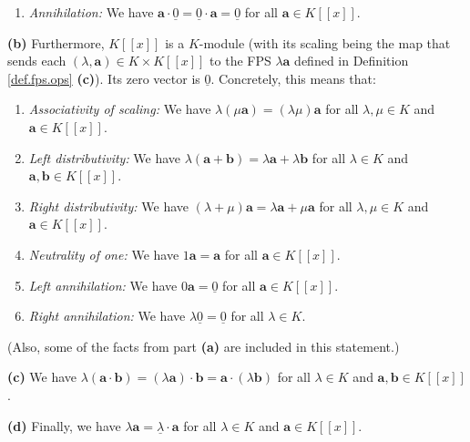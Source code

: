 \begin{theorem}
\begin{enumerate}
\item \emph{Annihilation:} We have $\mathbf{a}\cdot\underline{0}%
=\underline{0}\cdot\mathbf{a}=\underline{0}$ for all $\mathbf{a}\in K\left[
\left[  x\right]  \right]  $.
\end{enumerate}

\textbf{(b)} Furthermore, $K\left[  \left[  x\right]  \right]  $ is a
$K$-module (with its scaling being the map that sends each $\left(
\lambda,\mathbf{a}\right)  \in K\times K\left[  \left[  x\right]  \right]  $
to the FPS $\lambda\mathbf{a}$ defined in Definition \ref{def.fps.ops}
\textbf{(c)}). Its zero vector is $\underline{0}$. Concretely, this means that:

\begin{enumerate}
\item[10.] \emph{Associativity of scaling:} We have $\lambda\left(
\mu\mathbf{a}\right)  =\left(  \lambda\mu\right)  \mathbf{a}$ for all
$\lambda,\mu\in K$ and $\mathbf{a}\in K\left[  \left[  x\right]  \right]  $.

\item[11.] \emph{Left distributivity:} We have $\lambda\left(  \mathbf{a}%
+\mathbf{b}\right)  =\lambda\mathbf{a}+\lambda\mathbf{b}$ for all $\lambda\in
K$ and $\mathbf{a},\mathbf{b}\in K\left[  \left[  x\right]  \right]  $.

\item[12.] \emph{Right distributivity:} We have $\left(  \lambda+\mu\right)
\mathbf{a}=\lambda\mathbf{a}+\mu\mathbf{a}$ for all $\lambda,\mu\in K$ and
$\mathbf{a}\in K\left[  \left[  x\right]  \right]  $.

\item[13.] \emph{Neutrality of one:} We have $1\mathbf{a}=\mathbf{a}$ for all
$\mathbf{a}\in K\left[  \left[  x\right]  \right]  $.

\item[14.] \emph{Left annihilation:} We have $0\mathbf{a}=\underline{0}$ for
all $\mathbf{a}\in K\left[  \left[  x\right]  \right]  $.

\item[15.] \emph{Right annihilation:} We have $\lambda\underline{0}%
=\underline{0}$ for all $\lambda\in K$.
\end{enumerate}

(Also, some of the facts from part \textbf{(a)} are included in this
statement.) \medskip

\textbf{(c)} We have $\lambda\left(  \mathbf{a}\cdot\mathbf{b}\right)
=\left(  \lambda\mathbf{a}\right)  \cdot\mathbf{b}=\mathbf{a}\cdot\left(
\lambda\mathbf{b}\right)  $ for all $\lambda\in K$ and $\mathbf{a}%
,\mathbf{b}\in K\left[  \left[  x\right]  \right]  $. \medskip

\textbf{(d)} Finally, we have $\lambda\mathbf{a}=\underline{\lambda}%
\cdot\mathbf{a}$ for all $\lambda\in K$ and $\mathbf{a}\in K\left[  \left[
x\right]  \right]  $.
\end{theorem}


